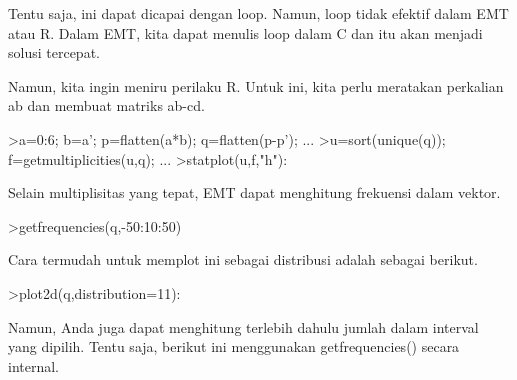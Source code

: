 \documentclass[a4paper,10pt]{article}
\begin{document}
\begin{eulernotebook}
\begin{eulercomment}
\begin{eulercomment}
\begin{eulercomment}
\begin{eulercomment}
\begin{eulercomment}
\begin{eulercomment}
\begin{eulercomment}
\begin{eulercomment}
\begin{eulercomment}
\begin{eulercomment}
\begin{eulercomment}
\begin{eulercomment}
\begin{eulercomment}
\begin{eulercomment}
\begin{eulercomment}
\begin{eulercomment}
\begin{eulercomment}
\begin{eulercomment}
\begin{eulercomment}
\begin{eulercomment}
\begin{eulercomment}
\begin{eulercomment}
\begin{eulercomment}
\begin{eulercomment}
\begin{eulercomment}
\begin{eulercomment}
\begin{eulercomment}
\begin{eulercomment}
\begin{eulercomment}
\begin{eulercomment}
\begin{eulercomment}
\begin{eulercomment}
\begin{eulercomment}
\begin{eulercomment}
\begin{eulercomment}
Tentu saja, ini dapat dicapai dengan loop. Namun, loop tidak efektif
dalam EMT atau R. Dalam EMT, kita dapat menulis loop dalam C dan itu
akan menjadi solusi tercepat.

Namun, kita ingin meniru perilaku R. Untuk ini, kita perlu meratakan
perkalian ab dan membuat matriks ab-cd.
\end{eulercomment}
\begin{eulerprompt}
>a=0:6; b=a'; p=flatten(a*b); q=flatten(p-p'); ...
>u=sort(unique(q)); f=getmultiplicities(u,q); ...
>statplot(u,f,"h"):
\end{eulerprompt}
\begin{eulercomment}
Selain multiplisitas yang tepat, EMT dapat menghitung frekuensi dalam
vektor.
\end{eulercomment}
\begin{eulerprompt}
>getfrequencies(q,-50:10:50)
\end{eulerprompt}
\begin{euleroutput}
  [0,  23,  132,  316,  602,  801,  333,  141,  53,  0]
\end{euleroutput}
\begin{eulercomment}
Cara termudah untuk memplot ini sebagai distribusi adalah sebagai
berikut.
\end{eulercomment}
\begin{eulerprompt}
>plot2d(q,distribution=11):
\end{eulerprompt}
\begin{eulercomment}
Namun, Anda juga dapat menghitung terlebih dahulu jumlah dalam
interval yang dipilih. Tentu saja, berikut ini menggunakan
getfrequencies() secara internal.


\end{eulercomment}
\end{eulercomment}
\end{eulercomment}
\end{eulercomment}
\end{eulercomment}
\end{eulercomment}
\end{eulercomment}
\end{eulercomment}
\end{eulercomment}
\end{eulercomment}
\end{eulercomment}
\end{eulercomment}
\end{eulercomment}
\end{eulercomment}
\end{eulercomment}
\end{eulercomment}
\end{eulercomment}
\end{eulercomment}
\end{eulercomment}
\end{eulercomment}
\end{eulercomment}
\end{eulercomment}
\end{eulercomment}
\end{eulercomment}
\end{eulercomment}
\end{eulercomment}
\end{eulercomment}
\end{eulercomment}
\end{eulercomment}
\end{eulercomment}
\end{eulercomment}
\end{eulercomment}
\end{eulercomment}
\end{eulercomment}
\end{eulercomment}
\end{eulernotebook}
\end{document}
